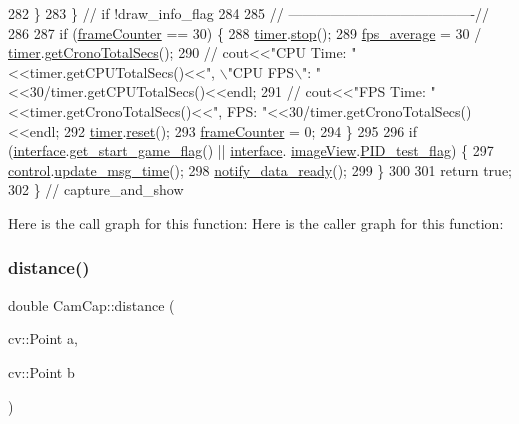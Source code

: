 \begin{DoxyCode}
282         \}
283     \} \textcolor{comment}{// if !draw\_info\_flag}
284 
285     \textcolor{comment}{// ----------------------------------------//}
286 
287     \textcolor{keywordflow}{if} (\hyperlink{class_cam_cap_a8a9611d808c20c937eb8a543bdf00cee}{frameCounter} == 30) \{
288         \hyperlink{class_cam_cap_a2ea4ba1566017370f13057ec3d8b43ff}{timer}.\hyperlink{class_c_p_u_timer_afc986e87c38afb37b7911f8424726d1d}{stop}();
289         \hyperlink{class_cam_cap_a01f1239b5e2b6478ebda3eac68c35bc1}{fps\_average} = 30 / \hyperlink{class_cam_cap_a2ea4ba1566017370f13057ec3d8b43ff}{timer}.\hyperlink{class_c_p_u_timer_aa8736023dbfa50166f8e49960ad84a84}{getCronoTotalSecs}();
290         \textcolor{comment}{// cout<<"CPU Time: "<<timer.getCPUTotalSecs()<<",  \(\backslash\)"CPU FPS\(\backslash\)":
       "<<30/timer.getCPUTotalSecs()<<endl;}
291         \textcolor{comment}{// cout<<"FPS Time: "<<timer.getCronoTotalSecs()<<", FPS: "<<30/timer.getCronoTotalSecs()<<endl;}
292         \hyperlink{class_cam_cap_a2ea4ba1566017370f13057ec3d8b43ff}{timer}.\hyperlink{class_c_p_u_timer_ae9c1b873923f73091dae7e5a6051baf6}{reset}();
293         \hyperlink{class_cam_cap_a8a9611d808c20c937eb8a543bdf00cee}{frameCounter} = 0;
294     \}
295     
296     \textcolor{keywordflow}{if} (\hyperlink{class_cam_cap_a58002893dfb61307042ddbba0c362dcd}{interface}.\hyperlink{class_v_s_s_s___g_u_i_1_1_v4_l_interface_afb1f877ebf3a82de783f6860979eea85}{get\_start\_game\_flag}() || \hyperlink{class_cam_cap_a58002893dfb61307042ddbba0c362dcd}{interface}.
      \hyperlink{class_v_s_s_s___g_u_i_1_1_v4_l_interface_a2c99f4d9fad8a34fa98d5b61beb06745}{imageView}.\hyperlink{class_image_view_ad94a51f7cd15b92c8c9defa5fb745b6d}{PID\_test\_flag}) \{
297         \hyperlink{class_cam_cap_a0e2b26d564d6baa6f5f60ce7227ad53f}{control}.\hyperlink{class_control_g_u_i_a7cdf0036f7b6c8ad8c9fb2a1c36e9c39}{update\_msg\_time}();
298         \hyperlink{class_cam_cap_ad34d9213700050e66a66e63d027b9bf0}{notify\_data\_ready}();
299     \}
300 
301     \textcolor{keywordflow}{return} \textcolor{keyword}{true};
302 \} \textcolor{comment}{// capture\_and\_show}
\end{DoxyCode}
Here is the call graph for this function\+:
Here is the caller graph for this function\+:
\mbox{\label{class_cam_cap_a6595a726e77091a8accf19e62dc55e41}} 
\subsubsection{\texorpdfstring{distance()}{distance()}}
{\footnotesize\ttfamily double Cam\+Cap\+::distance (\begin{DoxyParamCaption}\item[{cv\+::\+Point}]{a,  }\item[{cv\+::\+Point}]{b }\end{DoxyParamCaption})}



